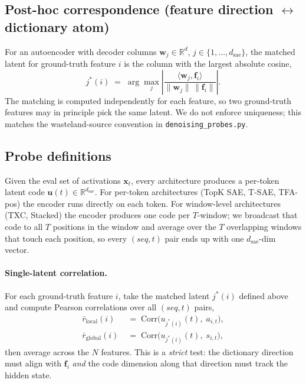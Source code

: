 \subsection{Post-hoc correspondence (feature direction $\leftrightarrow$ dictionary atom)}
\label{app:synthetic-matching}

For an autoencoder with decoder columns $\mathbf{w}_j \in \mathbb{R}^d$, $j \in \{1, \ldots, d_{\mathrm{sae}}\}$, the matched latent for ground-truth feature $i$ is the column with the largest absolute cosine,
\[
    j^*(i) \;=\; \arg\max_j \left| \frac{\langle \mathbf{w}_j, \mathbf{f}_i \rangle}{\lVert \mathbf{w}_j \rVert\, \lVert \mathbf{f}_i \rVert} \right|.
\]
The matching is computed independently for each feature, so two ground-truth features may in principle pick the same latent. We do not enforce uniqueness; this matches the wasteland-source convention in \texttt{denoising\_probes.py}.

\subsection{Probe definitions}
\label{app:synthetic-probes-defs}

Given the eval set of activations $\mathbf{x}_t$, every architecture produces a per-token latent code $\mathbf{u}(t) \in \mathbb{R}^{d_{\mathrm{sae}}}$. For per-token architectures (TopK SAE, T-SAE, TFA-pos) the encoder runs directly on each token. For window-level architectures (TXC, Stacked) the encoder produces one code per $T$-window; we broadcast that code to all $T$ positions in the window and average over the $T$ overlapping windows that touch each position, so every $(\textit{seq}, t)$ pair ends up with one $d_{\mathrm{sae}}$-dim vector.

\paragraph{Single-latent correlation.} For each ground-truth feature $i$, take the matched latent $j^*(i)$ defined above and compute Pearson correlations over all $(\textit{seq}, t)$ pairs,
\begin{align*}
    \bar r_{\mathrm{local}}(i) &\;=\; \mathrm{Corr}\!\big(u_{j^*(i)}(t),\; a_{i,t}\big), \\
    \bar r_{\mathrm{global}}(i) &\;=\; \mathrm{Corr}\!\big(u_{j^*(i)}(t),\; s_{i,t}\big),
\end{align*}
then average across the $N$ features. This is a \emph{strict} test: the dictionary direction must align with $\mathbf{f}_i$ \emph{and} the code dimension along that direction must track the hidden state.

